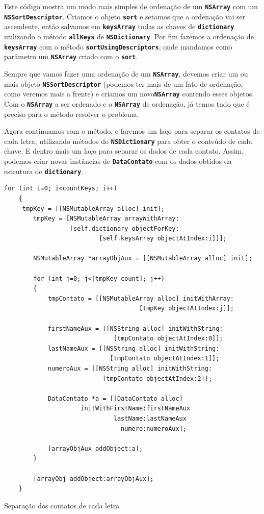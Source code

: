 \documentclass[a4paper,12pt,brazil,oneside]{book}
\begin{document}
Este código mostra um modo mais simples de ordenação de um \texttt{\textbf{NSArray}} 
com um \texttt{\textbf{NSSortDescriptor}}. Criamos o objeto \texttt{\textbf{sort}} e setamos que a ordenação vai ser ascendente, então salvamos em \texttt{\textbf{keysArray}} todas as chaves de \texttt{\textbf{dictionary}} utilizando o método \texttt{\textbf{allKeys}} de \texttt{\textbf{NSDictionary}}. Por fim fazemos a ordenação de \texttt{\textbf{keysArray}} com o método \texttt{\textbf{sortUsingDescriptors}}, onde mandamos como parâmetro um \texttt{\textbf{NSArray}} criado com o \texttt{\textbf{sort}}.

Sempre que vamos fazer uma ordenação de um \texttt{\textbf{NSArray}}, devemos criar um ou mais objeto \texttt{\textbf{NSSortDescriptor}} (podemos ter mais de um fato de ordenação, como veremos mais a frente) e criamos um novo\texttt{\textbf{NSArray}} contendo esses objetos. Com o \texttt{\textbf{NSArray}} a ser ordenado e o \texttt{\textbf{NSArray}} de ordenação, já temos tudo que é preciso para o método resolver o problema.

Agora continuamos com o método, e faremos um laço para separar os contatos de cada letra, utilizando métodos do \texttt{\textbf{NSDictionary}} para obter o conteúdo de cada chave. E dentro mais um laço para separar os dados de cada contato. Assim, podemos criar novas instâncias de \texttt{\textbf{DataContato}} com os dados obtidos da estrutura de \texttt{\textbf{dictionary}}.

\begin{listing}[H]
\begin{verbatim}
for (int i=0; i<countKeys; i++)
    {
	 tmpKey = [[NSMutableArray alloc] init];
        tmpKey = [NSMutableArray arrayWithArray:
                  [self.dictionary objectForKey:
                          [self.keysArray objectAtIndex:i]]];
        
        NSMutableArray *arrayObjAux = [[NSMutableArray alloc] init];
        
        for (int j=0; j<[tmpKey count]; j++)
        {
            tmpContato = [[NSMutableArray alloc] initWithArray:
                                     [tmpKey objectAtIndex:j]];

            firstNameAux = [[NSString alloc] initWithString:
                              [tmpContato objectAtIndex:0]];
            lastNameAux = [[NSString alloc] initWithString:
                             [tmpContato objectAtIndex:1]];
            numeroAux = [[NSString alloc] initWithString:
                           [tmpContato objectAtIndex:2]];
            
            DataContato *a = [[DataContato alloc] 
                     initWithFirstName:firstNameAux
                              lastName:lastNameAux
                                numero:numeroAux];
            
            [arrayObjAux addObject:a];            
        }
        
        [arrayObj addObject:arrayObjAux];
    }
\end{verbatim}
\caption{Separação dos contatos de cada letra}
\end{listing}
\end{document}
